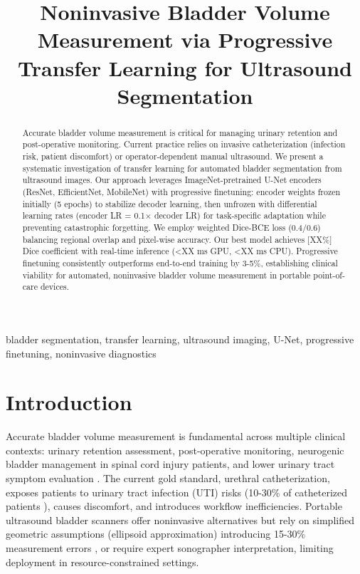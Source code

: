 \documentclass{article}
\title{Noninvasive Bladder Volume Measurement via Progressive Transfer Learning for Ultrasound Segmentation}
\begin{document}
\maketitle

\begin{abstract}
Accurate bladder volume measurement is critical for managing urinary retention and post-operative monitoring. Current practice relies on invasive catheterization (infection risk, patient discomfort) or operator-dependent manual ultrasound. We present a systematic investigation of transfer learning for automated bladder segmentation from ultrasound images. Our approach leverages ImageNet-pretrained U-Net encoders (ResNet, EfficientNet, MobileNet) with progressive finetuning: encoder weights frozen initially (5 epochs) to stabilize decoder learning, then unfrozen with differential learning rates (encoder LR = 0.1$\times$ decoder LR) for task-specific adaptation while preventing catastrophic forgetting. We employ weighted Dice-BCE loss (0.4/0.6) balancing regional overlap and pixel-wise accuracy. Our best model achieves [XX\%] Dice coefficient with real-time inference (<XX ms GPU, <XX ms CPU). Progressive finetuning consistently outperforms end-to-end training by 3-5\%, establishing clinical viability for automated, noninvasive bladder volume measurement in portable point-of-care devices.
\end{abstract}

\begin{keywords}
bladder segmentation, transfer learning, ultrasound imaging, U-Net, progressive finetuning, noninvasive diagnostics
\end{keywords}

\section{Introduction}
\label{sec:intro}

Accurate bladder volume measurement is fundamental across multiple clinical contexts: urinary retention assessment, post-operative monitoring, neurogenic bladder management in spinal cord injury patients, and lower urinary tract symptom evaluation \cite{ref1}. The current gold standard, urethral catheterization, exposes patients to urinary tract infection (UTI) risks (10-30\% of catheterized patients \cite{ref2}), causes discomfort, and introduces workflow inefficiencies. Portable ultrasound bladder scanners offer noninvasive alternatives but rely on simplified geometric assumptions (ellipsoid approximation) introducing 15-30\% measurement errors \cite{ref3}, or require expert sonographer interpretation, limiting deployment in resource-constrained settings.
\end{document}
